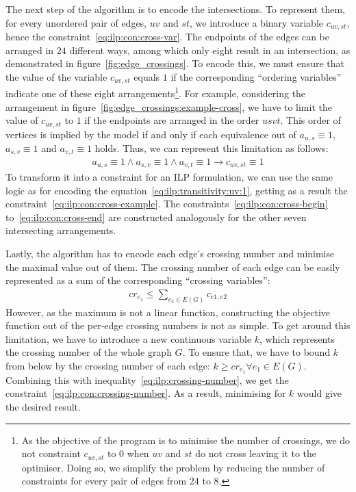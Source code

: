 The next step of the algorithm is to encode the intersections. To represent them, for every unordered pair of edges, \(uv\) and \(st\), we introduce a binary variable \(c_{uv, st}\), hence the constraint~\eqref{eq:ilp:con:cross-var}. The endpoints of the edges can be arranged in \(24\) different ways, among which only eight result in an intersection, as demonstrated in figure~\ref{fig:edge_crossings}. To encode this, we must ensure that the value of the variable \(c_{uv, st}\) equals \(1\) if the corresponding ``ordering variables'' indicate one of these eight arrangements\footnote{As the objective of the program is to minimise the number of crossings, we do not constraint \(c_{uv, st}\) to \(0\) when \(uv\) and \(st\) do not cross leaving it to the optimiser. Doing so, we simplify the problem by reducing the number of constraints for every pair of edges from \(24\) to \(8\).}. For example, considering the arrangement in figure~\ref{fig:edge_crossings:example-cross}, we have to limit the value of \(c_{uv, st}\) to \(1\) if the endpoints are arranged in the order \(usvt\). This order of vertices is implied by the model if and only if each equivalence out of \(a_{u,s} \equiv 1\), \(a_{s,v} \equiv 1\) and \(a_{v,t} \equiv 1\) holds. Thus, we can represent this limitation as follows:
\begin{align*}
    a_{u,s} \equiv 1 \land a_{s,v} \equiv 1 \land a_{v,t} \equiv 1 \longrightarrow c_{uv, st} \equiv 1
\end{align*}
To transform it into a constraint for an ILP formulation, we can use the same logic as for encoding the equation~\eqref{eq:ilp:transitivity:uv:1}, getting as a result the constraint~\eqref{eq:ilp:con:cross-example}. The constraints~\eqref{eq:ilp:con:cross-begin} to~\eqref{eq:ilp:con:cross-end} are constructed analogously for the other seven intersecting arrangements.

Lastly, the algorithm has to encode each edge's crossing number and minimise the maximal value out of them. The crossing number of each edge can be easily represented as a sum of the corresponding ``crossing variables'':
\begin{align}
    \label{eq:ilp:crossing-number}
    cr_{e_1} \leqslant \sum_{e_2 \in E(G)} c_{e1, e2}
\end{align}
However, as the maximum is not a linear function, constructing the objective function out of the per-edge crossing numbers is not as simple. To get around this limitation, we have to introduce a new continuous variable \(k\), which represents the crossing number of the whole graph \(G\). To ensure that, we have to bound \(k\) from below by the crossing number of each edge: \(k \geqslant cr_{e_1} \forall e_1 \in E(G)\). Combining this with inequality~\eqref{eq:ilp:crossing-number}, we get the constraint~\eqref{eq:ilp:con:crossing-number}. As a result, minimising for \(k\) would give the desired result.

